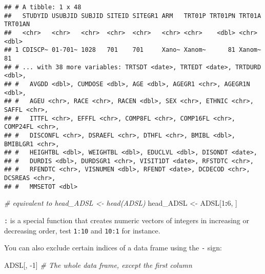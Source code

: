 \documentclass[]{book}
\newenvironment{Shaded}{\begin{snugshade}}{\end{snugshade}}
\newcommand{\CommentTok}[1]{\textcolor[rgb]{0.56,0.35,0.01}{\textit{#1}}}
\newcommand{\DecValTok}[1]{\textcolor[rgb]{0.00,0.00,0.81}{#1}}
\newcommand{\NormalTok}[1]{#1}
\newcommand{\OperatorTok}[1]{\textcolor[rgb]{0.81,0.36,0.00}{\textbf{#1}}}
\newcommand{\StringTok}[1]{\textcolor[rgb]{0.31,0.60,0.02}{#1}}
\begin{document}
\begin{verbatim}
## # A tibble: 1 x 48
##   STUDYID USUBJID SUBJID SITEID SITEGR1 ARM   TRT01P TRT01PN TRT01A TRT01AN
##   <chr>   <chr>   <chr>  <chr>  <chr>   <chr> <chr>    <dbl> <chr>    <dbl>
## 1 CDISCP~ 01-701~ 1028   701    701     Xano~ Xanom~      81 Xanom~      81
## # ... with 38 more variables: TRTSDT <date>, TRTEDT <date>, TRTDURD <dbl>,
## #   AVGDD <dbl>, CUMDOSE <dbl>, AGE <dbl>, AGEGR1 <chr>, AGEGR1N <dbl>,
## #   AGEU <chr>, RACE <chr>, RACEN <dbl>, SEX <chr>, ETHNIC <chr>, SAFFL <chr>,
## #   ITTFL <chr>, EFFFL <chr>, COMP8FL <chr>, COMP16FL <chr>, COMP24FL <chr>,
## #   DISCONFL <chr>, DSRAEFL <chr>, DTHFL <chr>, BMIBL <dbl>, BMIBLGR1 <chr>,
## #   HEIGHTBL <dbl>, WEIGHTBL <dbl>, EDUCLVL <dbl>, DISONDT <date>,
## #   DURDIS <dbl>, DURDSGR1 <chr>, VISIT1DT <date>, RFSTDTC <chr>,
## #   RFENDTC <chr>, VISNUMEN <dbl>, RFENDT <date>, DCDECOD <chr>, DCSREAS <chr>,
## #   MMSETOT <dbl>
\end{verbatim}

\begin{Shaded}
\begin{Highlighting}[]
\CommentTok{# equivalent to head_ADSL <- head(ADSL)}
\NormalTok{head_ADSL <-}\StringTok{ }\NormalTok{ADSL[}\DecValTok{1}\OperatorTok{:}\DecValTok{6}\NormalTok{, ] }
\end{Highlighting}
\end{Shaded}

\texttt{:} is a special function that creates numeric vectors of integers in increasing or decreasing order, test \texttt{1:10} and \texttt{10:1} for instance.

You can also exclude certain indices of a data frame using the \texttt{-} sign:

\begin{Shaded}
\begin{Highlighting}[]
\NormalTok{ADSL[, }\DecValTok{-1}\NormalTok{]          }\CommentTok{# The whole data frame, except the first column}
\end{Highlighting}
\end{Shaded}
\end{document}
